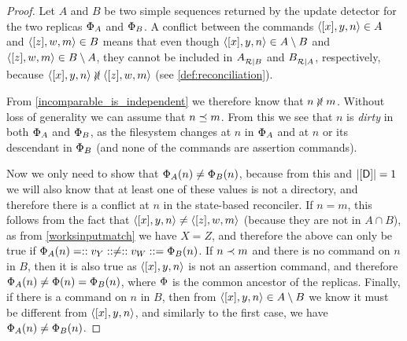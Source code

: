 \begin{proof}
Let $A$ and $B$ be two simple sequences returned by the update detector
for the two replicas $\Phi_A$ and $\Phi_B$.
A conflict between the commands $\langle{[x],y,n}\rangle\in A$ and $\langle{[z],w,m}\rangle\in B$
means that even though $\langle{[x],y,n}\rangle\in A\setminus B$
and $\langle{[z],w,m}\rangle\in B\setminus A$, they cannot be included in
${A}^{}_{\mathcal{R}|{B}}$ and ${B}^{}_{\mathcal{R}|{A}}$, respectively, because
$\cxynv\nindep\czwmv$ (see \cref{def:reconciliation}).

From \cref{incomparable_is_independent} we therefore know that $n\nunrel m$.
Without loss of generality we can assume that $n\preceq m$.
From this we see that $n$ is \emph{dirty} in both $\Phi_A$ and $\Phi_B$,
as the filesystem changes at $n$ in $\Phi_A$ and at $n$ or its descendant in $\Phi_B$
(and none of the commands are assertion commands).

Now we only need to show that $\Phi_A(n)\neq\Phi_B(n)$, because from this 
and $|[\mathsf{D}]|=1$ we will also
know that at least one of these values is not a directory,
and therefore there is a conflict at $n$ in the state-based reconciler.
If $n=m$, this follows from the fact that $\langle{[x],y,n}\rangle\neq\langle{[z],w,m}\rangle$ 
(because they are not in $A\cap B$),
as from \cref{worksinputmatch} we have $X=Z$,
and therefore the above can only be true
if $\Phi_A(n)=::v_Y::\neq::v_W::=\Phi_B(n)$.
If $n\prec m$ and there is no command on $n$ in $B$, then it is also
true as $\langle{[x],y,n}\rangle$ is not an assertion command, and therefore 
$\Phi_A(n)\neq\Phi(n)=\Phi_B(n)$, where $\Phi$ is the common ancestor of the replicas.
Finally, if there is a command on $n$ in $B$, then 
from $\langle{[x],y,n}\rangle\in A\setminus B$ we know
it must be different from $\langle{[x],y,n}\rangle$, and similarly to the first case,
we have $\Phi_A(n)\neq\Phi_B(n)$.
\end{proof}

